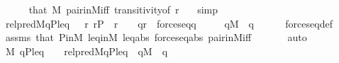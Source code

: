 \begin{isabellebody}
\ \ \ \ \isamarkupfalse%
\ that\ {\isacartoucheopen}{\isasymtau}{\isasymin}M{\isacartoucheclose}\ pair{\isacharunderscore}{\kern0pt}in{\isacharunderscore}{\kern0pt}M{\isacharunderscore}{\kern0pt}iff\ transitivity{\isacharbrackleft}{\kern0pt}of\ {\isachardoublequoteopen}{\isasymlangle}{\isasymsigma}{\isacharcomma}{\kern0pt}r{\isasymrangle}{\isachardoublequoteclose}\ {\isasymtau}{\isacharbrackright}{\kern0pt}\ \isamarkupfalse%
\ simp\isanewline
\ \ \isamarkupfalse%
\isanewline
\ \ \isamarkupfalse%
\ {\isachardoublequoteopen}{\isacharquery}{\kern0pt}rel{\isacharunderscore}{\kern0pt}pred{\isacharparenleft}{\kern0pt}{\isacharhash}{\kern0pt}{\isacharhash}{\kern0pt}M{\isacharcomma}{\kern0pt}q{\isacharcomma}{\kern0pt}P{\isacharcomma}{\kern0pt}leq{\isacharcomma}{\kern0pt}{\isasympi}{\isacharcomma}{\kern0pt}{\isasymtau}{\isacharparenright}{\kern0pt}\ {\isasymlongleftrightarrow}\ {\isacharparenleft}{\kern0pt}{\isasymexists}{\isasymsigma}{\isachardot}{\kern0pt}\ {\isasymexists}r{\isachardot}{\kern0pt}\ r{\isasymin}P\ {\isasymand}\ {\isasymlangle}{\isasymsigma}{\isacharcomma}{\kern0pt}r{\isasymrangle}\ {\isasymin}\ {\isasymtau}\ {\isasymand}\ q{\isasympreceq}r\ {\isasymand}\ forces{\isacharunderscore}{\kern0pt}eq{\isacharparenleft}{\kern0pt}q{\isacharcomma}{\kern0pt}{\isasympi}{\isacharcomma}{\kern0pt}{\isasymsigma}{\isacharparenright}{\kern0pt}{\isacharparenright}{\kern0pt}{\isachardoublequoteclose}\isanewline
\ \ \ \ \ {\isachardoublequoteopen}q{\isasymin}M{\isachardoublequoteclose}\ \ q\isanewline
\ \ \ \ \isamarkupfalse%
\ forces{\isacharunderscore}{\kern0pt}eq{\isacharunderscore}{\kern0pt}def\ \isamarkupfalse%
\ assms\ that\ P{\isacharunderscore}{\kern0pt}in{\isacharunderscore}{\kern0pt}M\ leq{\isacharunderscore}{\kern0pt}in{\isacharunderscore}{\kern0pt}M\ leq{\isacharunderscore}{\kern0pt}abs\ forces{\isacharunderscore}{\kern0pt}eq{\isacharprime}{\kern0pt}{\isacharunderscore}{\kern0pt}abs\ pair{\isacharunderscore}{\kern0pt}in{\isacharunderscore}{\kern0pt}M{\isacharunderscore}{\kern0pt}iff\ \isanewline
\ \ \ \ \isamarkupfalse%
\ auto\isanewline
\ \ \isamarkupfalse%
\isanewline
\ \ \isamarkupfalse%
\ {\isachardoublequoteopen}{\isacharparenleft}{\kern0pt}M{\isacharcomma}{\kern0pt}\ {\isacharbrackleft}{\kern0pt}q{\isacharcomma}{\kern0pt}P{\isacharcomma}{\kern0pt}leq{\isacharcomma}{\kern0pt}{\isasympi}{\isacharcomma}{\kern0pt}{\isasymtau}{\isacharbrackright}{\kern0pt}\ {\isasymTurnstile}\ {\isacharquery}{\kern0pt}{\isasymphi}{\isacharparenright}{\kern0pt}\ {\isasymlongleftrightarrow}\ {\isacharquery}{\kern0pt}rel{\isacharunderscore}{\kern0pt}pred{\isacharparenleft}{\kern0pt}{\isacharhash}{\kern0pt}{\isacharhash}{\kern0pt}M{\isacharcomma}{\kern0pt}q{\isacharcomma}{\kern0pt}P{\isacharcomma}{\kern0pt}leq{\isacharcomma}{\kern0pt}{\isasympi}{\isacharcomma}{\kern0pt}{\isasymtau}{\isacharparenright}{\kern0pt}{\isachardoublequoteclose}\ \ {\isachardoublequoteopen}q{\isasymin}M{\isachardoublequoteclose}\ \ q\isanewline

\end{isabellebody}
